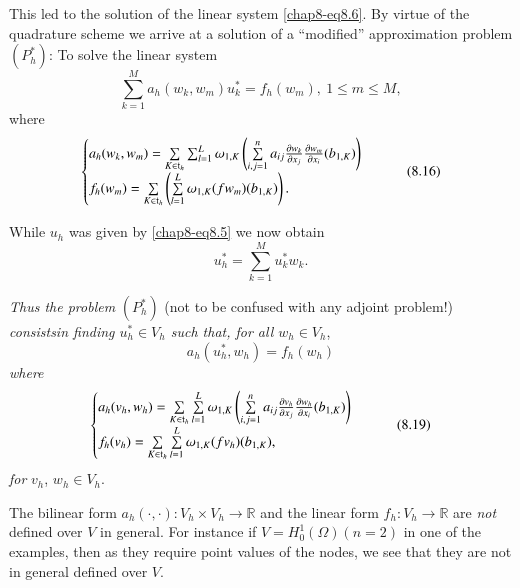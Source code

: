 This led to the solution of the linear system \eqref{chap8-eq8.6}. By
virtue of the quadrature scheme we arrive at a solution of a
``modified'' approximation problem $(P^{*}_{h})$: To solve the linear
system
\begin{equation*}
\sum^{M}_{k=1}a_{h}(w_{k},w_{m})u^{*}_{k}=f_{h}(w_{m}),\ 1\leq m\leq
M,\tag{8.15}\label{chap8-eq8.15} 
\end{equation*}
where
\begin{equation*}
\begin{cases}
a_{h}(w_{k},w_{m})=\sum\limits_{K\in\mathfrak{t}_{h}}\sum^{L}_{l=1}\omega_{1,K}\left(\sum\limits^{n}_{i,j=1}a_{ij}\frac{\partial
  w_{k}}{\partial x_{j}}\frac{\partial w_{m}}{\partial x_{i}}(b_{1,K})\right)\\ 
f_{h}(w_{m})=\sum\limits_{K\in\mathfrak{t}_{h}}\left(\sum\limits^{L}_{l=1}\omega_{1,K}(fw_{m})(b_{1,K})\right).
\end{cases}\tag{8.16}\label{chap8-eq8.16}
\end{equation*}

While $u_{h}$ was given by \eqref{chap8-eq8.5} we now obtain
\begin{equation*}
u^{*}_{h}=\sum^{M}_{k=1}u^{*}_{k}w_{k}.\tag{8.17}\label{chap8-eq8.17}
\end{equation*}

{\em Thus the problem} $(P^{*}_{h})$ (not to be confused with any
adjoint problem!) {\em consists\pageoriginale in finding $u^{*}_{h}\in
  V_{h}$ such that, for all $w_{h}\in V_{h}$},
\begin{equation*}
a_{h}(u^{*}_{h},w_{h})=f_{h}(w_{h})\tag{8.18}\label{chap8-eq8.18}
\end{equation*}
{\em where}
\begin{equation*}
\begin{cases}
a_{h}(v_{h},w_{h})=\sum\limits_{K\in\mathfrak{t}_{h}}\sum\limits^{L}_{l=1}\omega_{1,K}\left(\sum\limits^{n}_{i,j=1}a_{ij}\frac{\partial
  v_{h}}{\partial x_{j}}\frac{\partial w_{h}}{\partial x_{i}}(b_{1,K})\right)\\
f_{h}(v_{h})=\sum\limits_{K\in\mathfrak{t}_{h}}\sum\limits^{L}_{l=1}\omega_{1,K}(fv_{h})(b_{1,K}),
\end{cases}\tag{8.19}\label{chap8-eq8.19}
\end{equation*}
{\em for} $v_{h}$, $w_{h}\in V_{h}$.

\begin{remark}\label{chap8-rem8.1}
The bilinear form $a_{h}(\cdot,\cdot):V_{h}\times V_{h}\to \mathbb{R}$
and the linear form $f_{h}:V_{h}\to \mathbb{R}$ are {\em not} defined
over $V$ in general. For instance if $V=H^{1}_{0}(\Omega)(n=2)$ in one
of the examples, then as they require point values of the nodes, we
see that they are not in general defined over $V$.
\end{remark}

